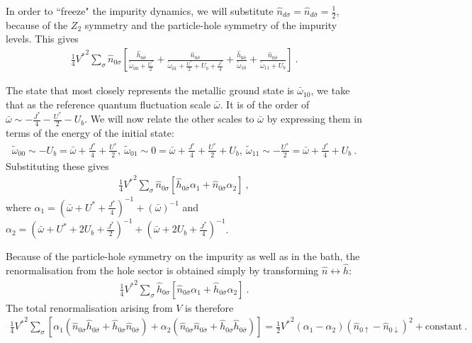 In order to ``freeze" the impurity dynamics, we will substitute \(\hat n_{d\sigma} = \hat n_{d\bar\sigma} = \frac{1}{2}\), because of the \({Z}_2\) symmetry and the particle-hole symmetry of the impurity levels. This gives
\begin{eqnarray}
	\frac{1}{4}{V^*}^2 \sum_\sigma \hat n_{0\sigma} \left[\frac{\hat h_{0\bar\sigma}}{\tilde\omega_{00} + \frac{U^*}{2}} + \frac{\hat n_{0\bar\sigma}}{\tilde\omega_{01} + \frac{U^*}{2} + U_b + \frac{J^*}{4}} + \frac{\hat h_{0\bar\sigma}}{\tilde\omega_{10}} + \frac{\hat n_{0\bar\sigma}}{\tilde\omega_{11} + U_b}\right]~.
\end{eqnarray}

The state that most closely represents the metallic ground state is \(\bar \omega_{10}\), we take that as the reference quantum fluctuation scale \(\bar\omega\). It is of the order of \(\bar\omega \sim -\frac{J^*}{4} - \frac{U^*}{2} - U_b\). We will now relate the other scales to \(\bar\omega\) by expressing them in terms of the energy of the initial state:
\begin{eqnarray}
	\tilde\omega_{00} \sim -U_b = \bar\omega + \frac{J^*}{4} + \frac{U^*}{2}, ~\tilde\omega_{01} \sim 0 = \bar\omega + \frac{J^*}{4} + \frac{U^*}{2} + U_b, ~\tilde\omega_{11} \sim -\frac{U^*}{2} = \bar\omega + \frac{J^*}{4} + U_b~.
\end{eqnarray}
Substituting these gives
\begin{eqnarray}
	\frac{1}{4}{V^*}^2 \sum_\sigma \hat n_{0\sigma} \left[\hat h_{0\bar\sigma}\alpha_1 + \hat n_{0\bar\sigma}\alpha_2\right]~,
\end{eqnarray}
where \(\alpha_1 = \left(\bar\omega + U^* + \frac{J^*}{4}\right)^{-1} + \left(\bar\omega\right)^{-1}\) and \(\alpha_2 = \left(\bar\omega + U^* + 2U_b + \frac{J^*}{2}\right)^{-1} + \left(\bar\omega + 2U_b + \frac{J^*}{4}\right)^{-1}\).

Because of the particle-hole symmetry on the impurity as well as in the bath, the renormalisation from the hole sector is obtained simply by transforming \(\hat n \leftrightarrow \hat h\):
\begin{eqnarray}
	\frac{1}{4}{V^*}^2 \sum_\sigma \hat h_{0\sigma} \left[\hat n_{0\bar\sigma}\alpha_1 + \hat h_{0\bar\sigma}\alpha_2\right]~.
\end{eqnarray}
The total renormalisation arising from \(V\) is therefore 
\begin{eqnarray}
	\frac{1}{4}{V^*}^2 \sum_\sigma \left[\alpha_1 \left( \hat n_{0\sigma}\hat h_{0\bar\sigma} + \hat h_{0\sigma}\hat n_{0\bar\sigma}\right) + \alpha_2 \left( \hat n_{0\sigma}\hat n_{0\bar\sigma} + \hat h_{0\sigma}\hat h_{0\bar\sigma}\right)\right] = \frac{1}{2}{V^*}^2 \left(\alpha_1 - \alpha_2\right) \left(\hat n_{0 \uparrow} - \hat n_{0 \downarrow}\right)^2 + \text{constant}~.\qquad
\end{eqnarray}

